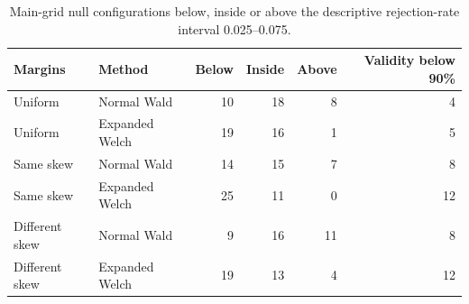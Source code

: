 \begin{table}[htbp]
\centering
\small
\caption{Main-grid null configurations below, inside or above the descriptive rejection-rate interval 0.025--0.075.}
\label{tab:null-band-summary}
\begin{tabular}{@{}llrrrr@{}}
\toprule
Margins & Method & Below & Inside & Above & Validity below 90\%\\
\midrule
Uniform & Normal Wald & 10 & 18 & 8 & 4 \\
Uniform & Expanded Welch & 19 & 16 & 1 & 5 \\
Same skew & Normal Wald & 14 & 15 & 7 & 8 \\
Same skew & Expanded Welch & 25 & 11 & 0 & 12 \\
Different skew & Normal Wald & 9 & 16 & 11 & 8 \\
Different skew & Expanded Welch & 19 & 13 & 4 & 12 \\
\bottomrule
\end{tabular}
\end{table}
